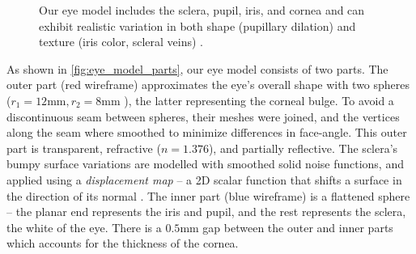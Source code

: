 \begin{figure}
    \captionsetup[subfigure]{labelformat=empty} %
    \captionsetup{subrefformat=parens} %
    \begin{subfigure}[t]{0.33\columnwidth}
        \caption{}\label{fig:eye_model_parts}
    \end{subfigure}
    \hfill
    \begin{subfigure}[t]{0.65\columnwidth}
        \caption{}\label{fig:eye_model_images}
    \end{subfigure}
    \par\vspace{-28pt}
    \caption{Our eye model includes the sclera, pupil, iris, and cornea  and can exhibit realistic variation in both shape (pupillary dilation) and texture (iris color, scleral veins) .}
    \label{fig:eye_model}
\end{figure}


As shown in \autoref{fig:eye_model_parts}, our eye model consists of two parts.
The outer part (red wireframe) approximates the eye's overall shape with two spheres ($r_1\!=\!12\textrm{mm}, r_2\!=\!8\textrm{mm}$ \cite{ruhland2014look}), the latter representing the corneal bulge.
To avoid a discontinuous seam between spheres, their meshes were joined, and the vertices along the seam where smoothed to minimize differences in face-angle.
This outer part is transparent, refractive ($n\!=\!1.376$), and partially reflective.
The sclera's bumpy surface variations are modelled with smoothed solid noise functions, and applied using a \emph{displacement map} -- a 2D scalar function that shifts a surface in the direction of its normal \cite{lee2000displaced}.
The inner part (blue wireframe) is a flattened sphere  -- the planar end represents the iris and pupil, and the rest represents the sclera, the white of the eye.
There is a $0.5\textrm{mm}$ gap between the outer and inner parts which accounts for the thickness of the cornea.

